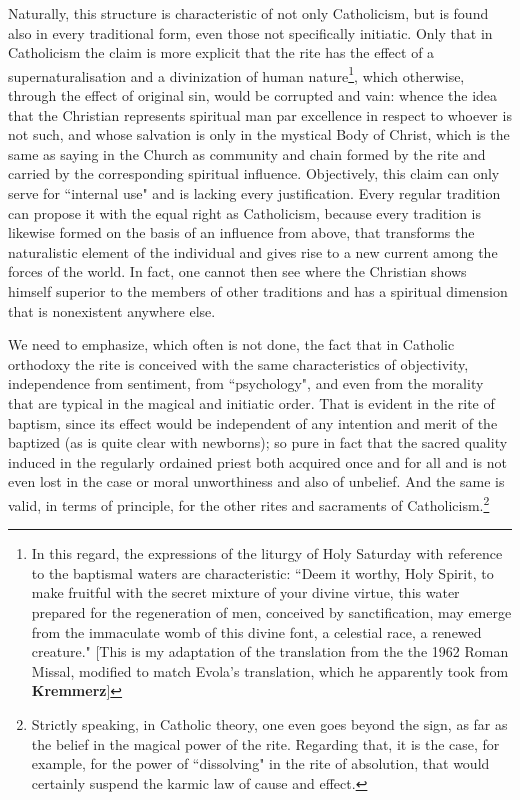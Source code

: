 Naturally, this structure is characteristic of not only Catholicism, but is found also in every traditional form, even those not specifically initiatic. Only that in Catholicism the claim is more explicit that the rite has the effect of a supernaturalisation and a divinization of human nature\footnote{In this regard, the expressions of the liturgy of Holy Saturday with reference to the baptismal waters are characteristic: ``Deem it worthy, Holy Spirit, to make fruitful with the secret mixture of your divine virtue, this water prepared for the regeneration of men, conceived by sanctification, may emerge from the immaculate womb of this divine font, a celestial race, a renewed creature." [This is my adaptation of the translation from the the 1962 Roman Missal, modified to match Evola's translation, which he apparently took from \textbf{Kremmerz}]}, which otherwise, through the effect of original sin, would be corrupted and vain: whence the idea that the Christian represents spiritual man par excellence in respect to whoever is not such, and whose salvation is only in the mystical Body of Christ, which is the same as saying in the Church as community and chain formed by the rite and carried by the corresponding spiritual influence. Objectively, this claim can only serve for ``internal use" and is lacking every justification. Every regular tradition can propose it with the equal right as Catholicism, because every tradition is likewise formed on the basis of an influence from above, that transforms the naturalistic element of the individual and gives rise to a new current among the forces of the world. In fact, one cannot then see where the Christian shows himself superior to the members of other traditions and has a spiritual dimension that is nonexistent anywhere else.

We need to emphasize, which often is not done, the fact that in Catholic orthodoxy the rite is conceived with the same characteristics of objectivity, independence from sentiment, from ``psychology", and even from the morality that are typical in the magical and initiatic order. That is evident in the rite of baptism, since its effect would be independent of any intention and merit of the baptized (as is quite clear with newborns); so pure in fact that the sacred quality induced in the regularly ordained priest both acquired once and for all and is not even lost in the case or moral unworthiness and also of unbelief. And the same is valid, in terms of principle, for the other rites and sacraments of Catholicism.\footnote{Strictly speaking, in Catholic theory, one even goes beyond the sign, as far as the belief in the magical power of the rite. Regarding that, it is the case, for example, for the power of ``dissolving" in the rite of absolution, that would certainly suspend the karmic law of cause and effect.}

